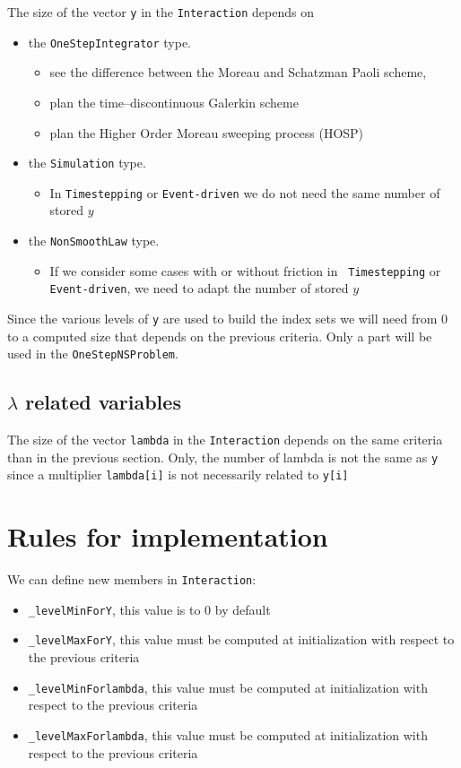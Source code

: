The size of the vector {\tt y} in the {\tt Interaction} depends on
\begin{itemize}
\item the {\tt  OneStepIntegrator} type.
  \begin{itemize}
  \item see the difference between the Moreau and Schatzman Paoli
    scheme,
  \item plan the time--discontinuous Galerkin scheme
  \item plan the Higher Order Moreau sweeping process (HOSP)
  \end{itemize}
\item the {\tt  Simulation} type.
  \begin{itemize}
  \item In {\tt Timestepping} or {\tt Event-driven} we do not need the same number of stored $y$
  \end{itemize}

\item the {\tt NonSmoothLaw} type.
  \begin{itemize}
  \item If we consider some cases with or without friction in {\tt
      Timestepping} or {\tt Event-driven}, we need to adapt the number
    of stored $y$
  \end{itemize}

\end{itemize}

Since the various levels of  {\tt y} are used to build the index sets we will need from $0$ to a computed size that depends on the previous criteria. Only a part will be used in the {\tt OneStepNSProblem}.

\subsection{$\lambda$ related variables}

The size of the vector {\tt lambda} in the {\tt Interaction} depends on the same criteria than in the previous section.  Only, the number of lambda is not the same as {\tt y} since a multiplier {\tt lambda[i]} is not necessarily related to {\tt y[i]}

\section{Rules for implementation}

We can define new members in {\tt Interaction}:
\begin{itemize}
\item {\tt \_levelMinForY}, this value is to $0$ by default
\item {\tt \_levelMaxForY},  this value must be computed at initialization with respect to the previous criteria
\item {\tt \_levelMinForlambda},  this value must be computed at initialization with respect to the previous criteria
\item {\tt \_levelMaxForlambda},  this value must be computed at initialization with respect to the previous criteria
\end{itemize}

